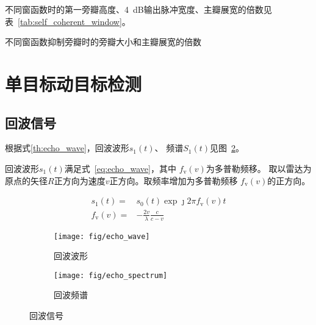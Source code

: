 \documentclass[../main]{subfiles}
\begin{document}
\begin{Answer}[ref = ex:2]
  不同窗函数时的第一旁瓣高度、\SI{4}{\dB}输出脉冲宽度、主瓣展宽的倍数见
  表~\ref{tab:self_coherent_window}。
\end{Answer}

\begin{table}[htbp]
  \centering
  \caption{不同窗函数抑制旁瓣时的旁瓣大小和主瓣展宽的倍数}%
  \label{tab:self_coherent_window}
  \scriptsize
\end{table}

\section{单目标动目标检测}%
\label{sec:single_mtd}

\subsection{回波信号}%
\label{sub:echo}

根据式\ref{th:echo_wave}，回波波形$s_1(t)$、
频谱$S_1(t)$见图~\ref{fig:echo}。

\begin{theorem}[多普勒效应]%
  \label{th:echo_wave}
  回波波形$s_1(t)$满足式~\ref{eq:echo_wave}，其中
  $f_\mathrm{v}(v)$为多普勒频移。
  取以雷达为原点的矢径$R$正方向为速度$v$正方向。取频率增加为多普勒频移
  $f_\mathrm{v}(v)$的正方向。
\end{theorem}

\begin{align}
  \label{eq:echo_wave}
  s_1(t) = & s_0(t)\exp{\jmath 2\pi f_\mathrm{v}(v)t}\\
  f_\mathrm{v}(v) = & -\frac{2v}{\lambda}\frac{c}{c - v}
\end{align}

\begin{figure}[htbp]
  \centering
  \begin{subfigure}[htbp]{0.45\linewidth}
    \centering
    \texttt{[image: fig/echo\_wave]}
    \caption{回波波形}%
    \label{fig:echo_wave}
  \end{subfigure}
  \quad
  \begin{subfigure}[htbp]{0.45\linewidth}
    \centering
    \texttt{[image: fig/echo\_spectrum]}
    \caption{回波频谱}%
  \end{subfigure}
  \caption{回波信号}%
  \label{fig:echo}
\end{figure}
\end{document}
